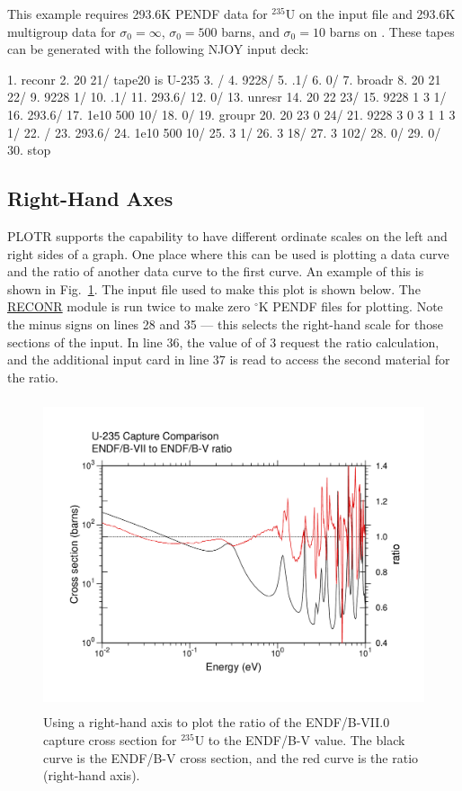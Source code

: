 \noindent
This example requires 293.6K PENDF data for $^{235}$U on the
input file  and 293.6K multigroup data for $\sigma_0=\infty$,
$\sigma_0=500$ barns, and $\sigma_0=10$ barns on .
These tapes can be generated with the following NJOY input deck:

\small
\begin{ccode}

   1.  reconr
   2.  20 21/ tape20 is U-235
   3.  /
   4.  9228/
   5.  .1/
   6.  0/
   7.  broadr
   8.  20 21 22/
   9.  9228 1/
  10.  .1/
  11.  293.6/
  12.  0/
  13.  unresr
  14.  20 22 23/
  15.  9228 1 3 1/
  16.  293.6/
  17.  1e10 500 10/
  18.  0/
  19.  groupr
  20.  20 23 0 24/
  21.  9228 3 0 3 1 1 3 1/
  22.  /
  23.  293.6/
  24.  1e10 500 10/
  25.  3 1/
  26.  3 18/
  27.  3 102/
  28.  0/
  29.  0/
  30.  stop

\end{ccode}
\normalsize

\subsection{Right-Hand Axes}
\label{ssPLOTR_righthand}

PLOTR supports the capability to have different ordinate scales
on the left and right sides of a graph.  One place where this
can be used is plotting a data curve and the ratio of another
data curve to the first curve.  An example of this is shown
in Fig.~\ref{rhax}.  The input file used to make this plot is
shown below.  The \hyperlink{sRECONRhy}{RECONR} module
is run twice to make zero $^\circ$K
PENDF files for plotting.  Note the minus signs on lines
28 and 35 --- this selects the right-hand scale for those sections
of the input.  In line 36, the value of  of 3
request the ratio calculation, and the additional input card
in line 37 is read to access the second material for the ratio.

\begin{figure}[b]\centering
\includegraphics[keepaspectratio, height=3.6in,angle=0]{figs/plotr6aack}
\caption[Sample plot with left- and right-hand axes defined]{Using a right-hand
 axis to plot the ratio of the ENDF/B-VII.0 capture cross section for $^{235}$U
 to the ENDF/B-V value.  The black curve is the ENDF/B-V cross section, and
 the red curve is the ratio (right-hand axis).}
\label{rhax}
\end{figure}

